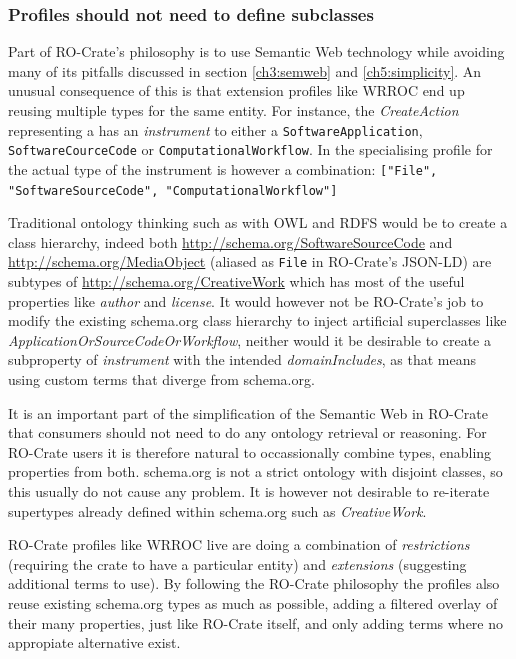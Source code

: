 \subsubsection{Profiles should not need to define subclasses}

Part of RO-Crate's philosophy is to use Semantic Web technology while avoiding many of its pitfalls discussed in section \vref{ch3:semweb} and \vref{ch5:simplicity}. 
An unusual consequence of this is that extension profiles like WRROC end up reusing multiple types for the same entity.  For instance, the \emph{CreateAction} representing a  has an \emph{instrument} to either a \texttt{SoftwareApplication}, \texttt{SoftwareCourceCode} or \texttt{ComputationalWorkflow}. In the specialising profile for  the actual type of the instrument is however a combination: \texttt{["File", "SoftwareSourceCode", "ComputationalWorkflow"]}

Traditional ontology thinking such as with OWL and RDFS would be to create a class hierarchy, indeed both  \url{http://schema.org/SoftwareSourceCode} and \url{http://schema.org/MediaObject} (aliased as \texttt{File} in RO-Crate's JSON-LD) are subtypes of \url{http://schema.org/CreativeWork} which has most of the useful properties like \emph{author} and \emph{license}. It would however not be RO-Crate's job to modify the existing schema.org class hierarchy to inject artificial superclasses like \emph{ApplicationOrSourceCodeOrWorkflow}, neither would it be desirable to create a subproperty of \emph{instrument} with the intended \emph{domainIncludes}, as that means using custom terms that diverge from schema.org. 

It is an important part of the simplification of the Semantic Web in RO-Crate that consumers should not need to do any ontology retrieval or reasoning. For RO-Crate users it is therefore natural to occassionally combine types, enabling properties from both. schema.org is not a strict ontology with disjoint classes, so this usually do not cause any problem. It is however not desirable to re-iterate supertypes already defined within schema.org such as \emph{CreativeWork}. 

RO-Crate profiles like WRROC live are doing a combination of \emph{restrictions} (requiring the crate to have a particular entity) and \emph{extensions} (suggesting additional terms to use). By following the RO-Crate philosophy the profiles also reuse existing schema.org types as much as possible, adding a filtered overlay of their many properties, just like RO-Crate itself, and only adding terms where no appropiate alternative exist.

